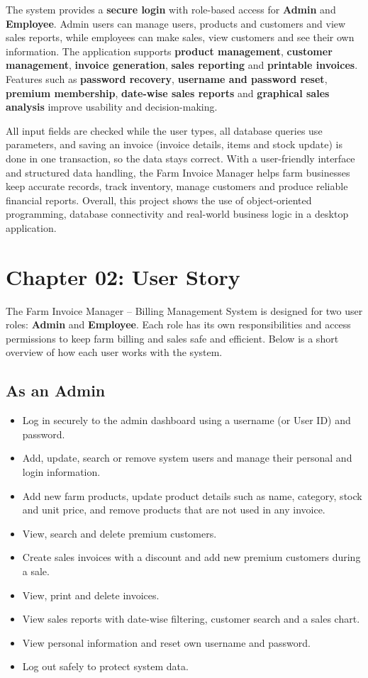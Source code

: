 \documentclass[12pt,a4paper]{article}
\begin{document}
The system provides a \textbf{secure login} with role-based access for \textbf{Admin} and \textbf{Employee}. Admin users can manage users, products and customers and view sales reports, while employees can make sales, view customers and see their own information. The application supports \textbf{product management}, \textbf{customer management}, \textbf{invoice generation}, \textbf{sales reporting} and \textbf{printable invoices}. Features such as \textbf{password recovery}, \textbf{username and password reset}, \textbf{premium membership}, \textbf{date-wise sales reports} and \textbf{graphical sales analysis} improve usability and decision-making.

All input fields are checked while the user types, all database queries use parameters, and saving an invoice (invoice details, items and stock update) is done in one transaction, so the data stays correct. With a user-friendly interface and structured data handling, the Farm Invoice Manager helps farm businesses keep accurate records, track inventory, manage customers and produce reliable financial reports. Overall, this project shows the use of object-oriented programming, database connectivity and real-world business logic in a desktop application.

\section{Chapter 02: User Story}\label{ch:story}

The Farm Invoice Manager -- Billing Management System is designed for two user roles: \textbf{Admin} and \textbf{Employee}. Each role has its own responsibilities and access permissions to keep farm billing and sales safe and efficient. Below is a short overview of how each user works with the system.

\subsection{As an Admin}
\begin{itemize}
\item Log in securely to the admin dashboard using a username (or User ID) and password.
\item Add, update, search or remove system users and manage their personal and login information.
\item Add new farm products, update product details such as name, category, stock and unit price, and remove products that are not used in any invoice.
\item View, search and delete premium customers.
\item Create sales invoices with a discount and add new premium customers during a sale.
\item View, print and delete invoices.
\item View sales reports with date-wise filtering, customer search and a sales chart.
\item View personal information and reset own username and password.
\item Log out safely to protect system data.
\end{itemize}
\end{document}
